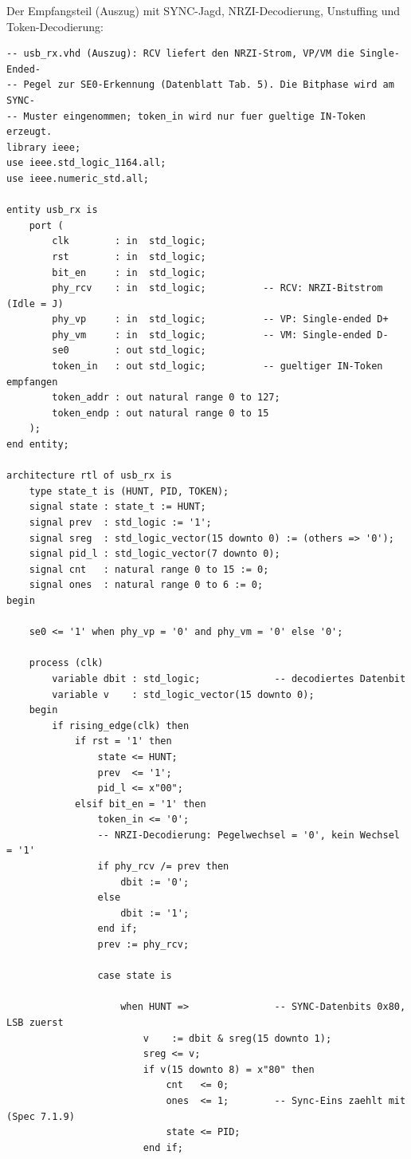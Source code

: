 \documentclass[a4paper,11pt]{article}
\begin{document}
Der Empfangsteil (Auszug) mit SYNC-Jagd, NRZI-Decodierung, Unstuffing und Token-Decodierung:

\begin{verbatim}
-- usb_rx.vhd (Auszug): RCV liefert den NRZI-Strom, VP/VM die Single-Ended-
-- Pegel zur SE0-Erkennung (Datenblatt Tab. 5). Die Bitphase wird am SYNC-
-- Muster eingenommen; token_in wird nur fuer gueltige IN-Token erzeugt.
library ieee;
use ieee.std_logic_1164.all;
use ieee.numeric_std.all;

entity usb_rx is
    port (
        clk        : in  std_logic;
        rst        : in  std_logic;
        bit_en     : in  std_logic;
        phy_rcv    : in  std_logic;          -- RCV: NRZI-Bitstrom (Idle = J)
        phy_vp     : in  std_logic;          -- VP: Single-ended D+
        phy_vm     : in  std_logic;          -- VM: Single-ended D-
        se0        : out std_logic;
        token_in   : out std_logic;          -- gueltiger IN-Token empfangen
        token_addr : out natural range 0 to 127;
        token_endp : out natural range 0 to 15
    );
end entity;

architecture rtl of usb_rx is
    type state_t is (HUNT, PID, TOKEN);
    signal state : state_t := HUNT;
    signal prev  : std_logic := '1';
    signal sreg  : std_logic_vector(15 downto 0) := (others => '0');
    signal pid_l : std_logic_vector(7 downto 0);
    signal cnt   : natural range 0 to 15 := 0;
    signal ones  : natural range 0 to 6 := 0;
begin

    se0 <= '1' when phy_vp = '0' and phy_vm = '0' else '0';

    process (clk)
        variable dbit : std_logic;             -- decodiertes Datenbit
        variable v    : std_logic_vector(15 downto 0);
    begin
        if rising_edge(clk) then
            if rst = '1' then
                state <= HUNT;
                prev  <= '1';
                pid_l <= x"00";
            elsif bit_en = '1' then
                token_in <= '0';
                -- NRZI-Decodierung: Pegelwechsel = '0', kein Wechsel = '1'
                if phy_rcv /= prev then
                    dbit := '0';
                else
                    dbit := '1';
                end if;
                prev := phy_rcv;

                case state is

                    when HUNT =>               -- SYNC-Datenbits 0x80, LSB zuerst
                        v    := dbit & sreg(15 downto 1);
                        sreg <= v;
                        if v(15 downto 8) = x"80" then
                            cnt   <= 0;
                            ones  <= 1;        -- Sync-Eins zaehlt mit (Spec 7.1.9)
                            state <= PID;
                        end if;


\end{verbatim}
\end{document}
